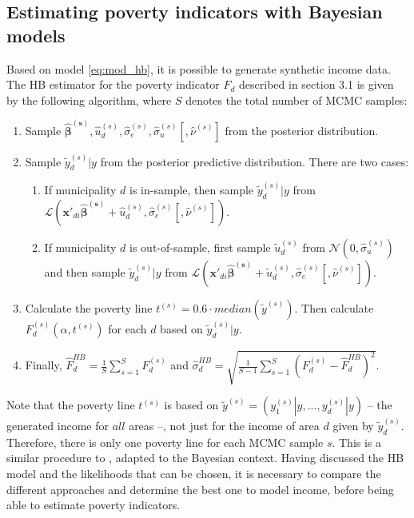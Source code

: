 \subsection{Estimating poverty indicators with Bayesian models}

Based on model \ref{eq:mod_hb}, it is possible to generate synthetic income data. The HB estimator for the poverty indicator $F_d$ described in section 3.1 is given by the following algorithm, where $S$ denotes the total number of MCMC samples: \\
\begin{enumerate}
    \itemsep -6mm
    \item Sample $\boldsymbol {\hat \beta^{(s)}}, \hat u_d^{(s)}, \hat \sigma_e^{(s)}, \hat \sigma_u^{(s)}[, \hat \nu^{(s)}]$ from the posterior distribution.\\
    \item Sample $\tilde y_d^{(s)}|y$ from the posterior predictive distribution. There are two cases:
    \begin{enumerate}
        \itemsep -8mm
        \item If municipality $d$ is in-sample, then sample $\tilde y^{(s)}_d|y$ from  $\mathcal L (\boldsymbol{x'}_{di} \boldsymbol {\hat \beta^{(s)}} + \hat u_d^{(s)}, \hat \sigma_e^{(s)}[, \hat \nu^{(s)}])$. \\
        \item If municipality $d$ is out-of-sample, first sample $\tilde u_d^{(s)}$ from $\mathcal N(0, \hat \sigma_u^{(s)})$ and then sample $\tilde y^{(s)}_d|y$ from $\mathcal L (\boldsymbol{x'}_{di} \boldsymbol {\hat \beta^{(s)}} + \tilde u_d^{(s)}, \hat \sigma_e^{(s)}[, \hat \nu^{(s)}])$.\\
    \end{enumerate}
    \item Calculate the poverty line $t^{(s)} = 0.6 \cdot median(\tilde y ^{(s)})$. Then calculate $F_d^{(s)}(\alpha, t^{(s)})$ for each $d$ based on $\tilde y_{d}^{(s)}|y$.\\
    \item Finally, $\hat F_d^{HB} = \displaystyle \frac 1 S \sum_{s = 1}^S F_d^{(s)}$ and $\hat \sigma^{HB}_d = \displaystyle\sqrt{ \frac{1}{S-1}  \sum_{s = 1}^S \left( F_d^{(s)} - \hat F_d^{HB} \right)^2}$.

\end{enumerate}
Note that the poverty line $t^{(s)}$ is based on $\tilde y^{(s)} = (y^{(s)}_1|y, ..., y^{(s)}_d|y)$ – the generated income for $all$ areas –, not just for the income of area $d$ given by $\tilde y_d^{(s)}$. Therefore, there is only one poverty line for each MCMC sample $s$. This is a similar procedure to \cite{rojas_perilla_data_2020}, adapted to the Bayesian context. Having discussed the HB model and the likelihoods that can be chosen, it is necessary to compare the different approaches and determine the best one to model income, before being able to estimate poverty indicators.